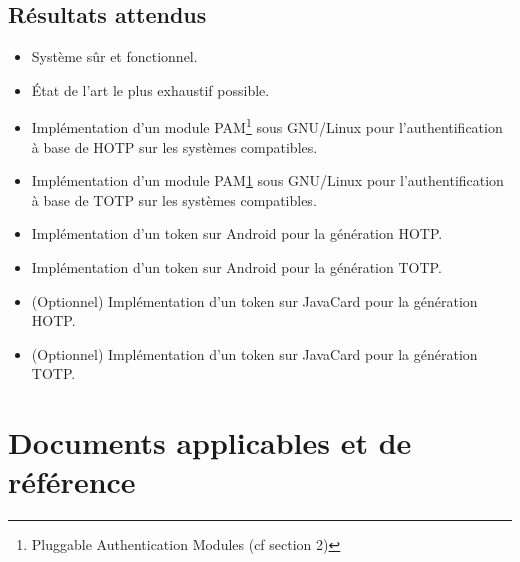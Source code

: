 \documentclass{"../../res/univ-projet"}
\begin{document}
    \subsection{Résultats attendus} 
        \begin{itemize}
            \item Système sûr et fonctionnel.
            \item État de l'art le plus exhaustif possible.
            \item Implémentation d'un module PAM\footnote{Pluggable Authentication Modules (cf section 2)\label{refPAM}} 
            sous GNU/Linux pour l'authentification à base de HOTP sur les systèmes compatibles.
            \item Implémentation d'un module PAM\ref{refPAM} sous GNU/Linux pour l'authentification à base de TOTP sur les systèmes compatibles.
            \item Implémentation d'un token sur Android pour la génération HOTP.
            \item Implémentation d'un token sur Android pour la génération TOTP.
            \item (Optionnel) Implémentation d'un token sur JavaCard pour la génération HOTP.
            \item (Optionnel) Implémentation d'un token sur JavaCard pour la génération TOTP.
        \end{itemize}
        
\newpage
\section{Documents applicables et de référence}
\end{document}
